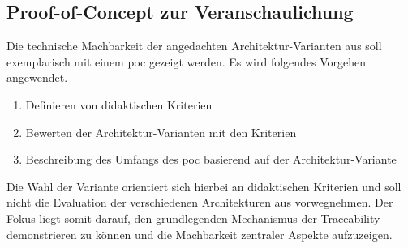 \subsection{Proof-of-Concept zur Veranschaulichung}
\label{sec:poc-methodology}

Die technische Machbarkeit der angedachten Architektur-Varianten aus  soll exemplarisch mit einem \ac{poc} gezeigt werden. Es wird folgendes Vorgehen angewendet.

\begin{enumerate}
    \item Definieren von didaktischen Kriterien
    \item Bewerten der Architektur-Varianten mit den Kriterien
    \item Beschreibung des Umfangs des \ac{poc} basierend auf der Architektur-Variante
\end{enumerate}

Die Wahl der Variante orientiert sich hierbei an didaktischen Kriterien und soll nicht die Evaluation der verschiedenen Architekturen aus  vorwegnehmen. Der Fokus liegt somit darauf, den grundlegenden Mechanismus der Traceability demonstrieren zu können und die Machbarkeit zentraler Aspekte aufzuzeigen.

